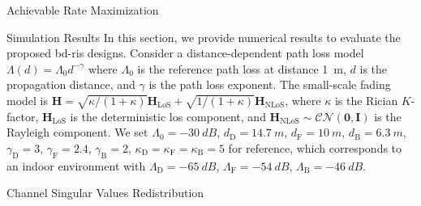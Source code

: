 \documentclass[journal]{IEEEtran}
\begin{document}
\begin{section}{Achievable Rate Maximization}


\end{section}

\begin{section}{Simulation Results}
	In this section, we provide numerical results to evaluate the proposed \gls{bd}-\gls{ris} designs.
	Consider a distance-dependent path loss model $\Lambda(d) = \Lambda_0 d^{-\gamma}$ where $\Lambda_0$ is the reference path loss at distance \qty{1}{m}, $d$ is the propagation distance, and $\gamma$ is the path loss exponent.
	The small-scale fading model is $\mathbf{H} = \sqrt{\kappa/(1+\kappa)} \mathbf{H}_\text{LoS} + \sqrt{1/(1+\kappa)} \mathbf{H}_\text{NLoS}$, where $\kappa$ is the Rician $K$-factor, $\mathbf{H}_\text{LoS}$ is the deterministic \gls{los} component, and $\mathbf{H}_\text{NLoS} \sim \mathcal{CN}(\mathbf{0}, \mathbf{I})$ is the Rayleigh component.
	We set $\Lambda_0=\qty{-30}{dB}$, $d_\mathrm{D}=\qty{14.7}{m}$, $d_\mathrm{F}=\qty{10}{m}$, $d_\mathrm{B}=\qty{6.3}{m}$, $\gamma_\mathrm{D}=3$, $\gamma_\mathrm{F}=2.4$, $\gamma_\mathrm{B}=2$, $\kappa_\mathrm{D}=\kappa_\mathrm{F}=\kappa_\mathrm{B}=5$ for reference, which corresponds to an indoor environment with $\Lambda_\mathrm{D}=\qty{-65}{dB}$, $\Lambda_\mathrm{F}=\qty{-54}{dB}$, $\Lambda_\mathrm{B}=\qty{-46}{dB}$.

	\begin{subsection}{Channel Singular Values Redistribution}

		\begin{figure}[!t]
			\centering
			\\
		\end{figure}


\end{subsection}
\end{section}
\end{document}
